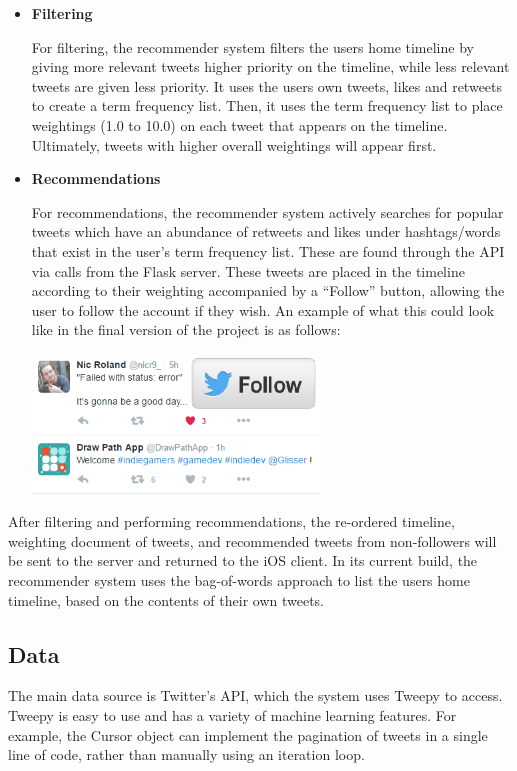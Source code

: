 \documentclass{article}
\begin{document}
\begin{itemize}
    \item \textbf{Filtering}

    For filtering, the recommender system filters the users home timeline by giving more relevant tweets higher priority on the timeline, while less relevant tweets are given less priority. It uses the users own tweets, likes and retweets to create a term frequency list. Then, it uses the term frequency list to place weightings (1.0 to 10.0) on each tweet that appears on the timeline. Ultimately, tweets with higher overall weightings will appear first.

    \item \textbf{Recommendations}

    For recommendations, the recommender system actively searches for popular tweets which have an abundance of retweets and likes under hashtags/words that exist in the user's term frequency list. These are found through the API via calls from the Flask server. These tweets are placed in the timeline according to their weighting accompanied by a “Follow” button, allowing the user to follow the account if they wish. An example of what this could look like in the final version of the project is as follows:
    
    \begin{center}
        \includegraphics[width=0.6\textwidth]{follow_button}
    \end{center}

\end{itemize}

After filtering and performing recommendations, the re-ordered timeline, weighting document of tweets, and recommended tweets from non-followers will be sent to the server and returned to the iOS client. In its current build, the recommender system uses the bag-of-words approach to list the users home timeline, based on the contents of their own tweets.

\subsection{Data}
The main data source is Twitter's API, which the system uses Tweepy to access. Tweepy is easy to use and has a variety of machine learning features. For example, the Cursor\cite{cursor} object can implement the pagination of tweets in a single line of code, rather than manually using an iteration loop.
\end{document}
